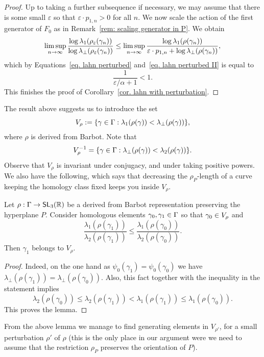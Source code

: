 \documentclass[AHL,Unicode,longabstracts]{cedram}
\DeclareMathOperator{\SL}{\mathsf{SL}}
\newcommand{\R}{\mathbb{R}}
\newcommand{\RR}{\R}
\renewcommand*{\to}{\mathchoice{\longrightarrow}{\rightarrow}{\rightarrow}{\rightarrow}}
\let\originalleft\left
\let\originalright\right
\renewcommand{\left}{\mathopen{}\mathclose\bgroup\originalleft}
\renewcommand{\right}{\aftergroup\egroup\originalright}
\let\oldin\in
\renewcommand{\in}{\mathchoice{\oldin}{\oldin}{\,\oldin\,}{\,\oldin\,}}
\newcommand{\RR}{\mathbb{R}}
\begin{document}
\begin{proof}
Up to taking a further subsequence if necessary, we may assume that there is some small $\varepsilon$ so that $\varepsilon \cdot p_{1,n}>0$ for all $n$. We now scale the action of the first generator of $F_0$ as in Remark~\ref{rem: scaling generator in P}.
We obtain
\[
\limsup_{n\to\infty}\frac{\log\lambda_1(\rho_\varepsilon(\gamma_n))}{\log\lambda_\perp(\rho_\varepsilon(\gamma_n))}\leq \limsup_{n\to\infty}\frac{\log\lambda_1(\rho(\gamma_n))}{\varepsilon \cdot p_{1,n}+\log\lambda_\perp(\rho(\gamma_n))},
\]
which by Equations~\eqref{eq. lahn perturbed} and~\eqref{eq. lahn perturbed II} is equal to
\[
\frac{1}{\varepsilon/\alpha+1}<1.
\]
This finishes the proof of Corollary~\ref{cor. lahn with perturbation}.
\end{proof}


The result above suggests us to introduce the set
\[
V_\rho:=\left\{\gamma\in\Gamma: \lambda_1(\rho(\gamma)) < \lambda_\perp(\rho(\gamma))\right\},
\]
where $\rho$ is derived from Barbot.
Note that
\[
V_\rho^{-1}=\left\{\gamma\in\Gamma: \lambda_\perp(\rho(\gamma))< \lambda_2(\rho(\gamma))\right\}.
\]
Observe that $V_\rho$ is invariant under conjugacy, and under taking positive powers. We also have the following, which says that decreasing the $\rho_P$-length of a curve keeping the homology class fixed keeps you inside $V_\rho$.

\begin{lemm}\label{lem: short representatives in V}
Let $\rho: \Gamma \to \SL_3(\RR)$ be a derived from Barbot representation preserving the hyperplane $P$.
Consider homologous elements $\gamma_0,\gamma_1\in\Gamma$ so that $\gamma_0\in V_\rho$ and
\[
\frac{\lambda_1(\rho(\gamma_1))}{\lambda_2(\rho(\gamma_1))}\leq \frac{\lambda_1(\rho(\gamma_0))}{\lambda_2(\rho(\gamma_0))}.
\]
Then $\gamma_1$ belongs to $V_\rho$.
\end{lemm}

\begin{proof}
Indeed, on the one hand as $\psi_0(\gamma_1)=\psi_0(\gamma_0)$ we have $\lambda_\perp(\rho(\gamma_1))=
\lambda_\perp(\rho(\gamma_0))$.
Also, this fact together with the inequality in the statement implies
\[
\lambda_2(\rho(\gamma_0))\leq \lambda_2(\rho(\gamma_1))< \lambda_1(\rho(\gamma_1))\leq \lambda_1(\rho(\gamma_0)).
\]
This proves the lemma.
\end{proof}



From the above lemma we manage to find generating elements in $V_{\rho'}$, for a small perturbation $\rho'$ of $\rho$ (this is the only place in our argument were we need to assume that the restriction $\rho_P$ preserves the orientation of $P$).
\end{document}
